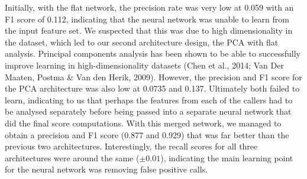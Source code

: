 \documentclass{article}
\begin{document}
Initially, with the flat network, the precision rate was very low at 0.059 with an F1 score of 0.112, indicating that the neural network was unable to learn from the input feature set. We suspected that this was due to high dimensionality in the dataset, which led to our second architecture design, the PCA with flat analysis. Principal components analysis has been shown to be able to successfully improve learning in high-dimensionality datasets (Chen et al., 2014; Van Der Maaten, Postma \& Van den Herik, 2009). However, the precision and F1 score for the PCA architecture was also low at 0.0735 and 0.137. Ultimately both failed to learn, indicating to us that perhaps the features from each of the callers had to be analysed separately before being passed into a separate neural network that did the final score computations. With this merged network, we managed to obtain a precision and F1 score (0.877 and 0.929) that was far better than the previous two architectures. Interestingly, the recall scores for all three architectures were around the same ($\pm 0.01$), indicating the main learning point for the neural network was removing false positive calls.
\end{document}
